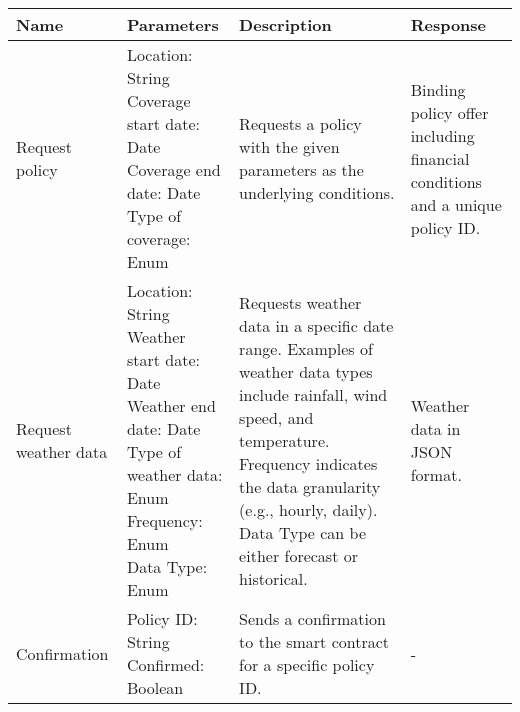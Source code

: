 \renewcommand{\arraystretch}{1.3}
\begin{tabular}{|>{\centering\arraybackslash}m{2cm}|>{\centering\arraybackslash}p{5cm}|>{\centering\arraybackslash}m{5cm}|>{\centering\arraybackslash}m{3cm}|}
    \hline
    \textbf{Name} & \textbf{Parameters} & \textbf{Description} & \textbf{Response} \\ 
    \hline
    Request policy & \makecell{Location: String \\ Coverage start date: Date \\ Coverage end date: Date \\ Type of coverage: Enum}  & Requests a policy with the given parameters as the underlying conditions. & Binding policy offer including financial conditions and a unique policy ID.\\ 
    \hline
    Request weather data & \makecell{Location: String \\ Weather start date: Date \\ Weather end date: Date \\ Type of weather data: Enum \\ Frequency: Enum \\ Data Type: Enum} & Requests weather data in a specific date range. Examples of weather data types include rainfall, wind speed, and temperature. Frequency indicates the data granularity (e.g., hourly, daily). Data Type can be either forecast or historical. &  Weather data in JSON format. \\ 
    \hline
    Confirmation & \makecell{Policy ID: String \\ Confirmed: Boolean} & Sends a confirmation to the smart contract for a specific policy ID. & - \\ 
    \hline
\end{tabular}